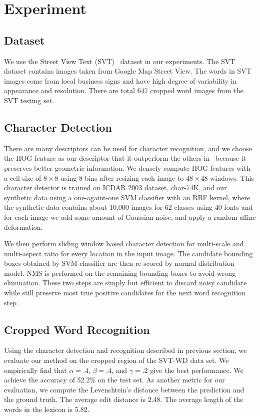 \documentclass[10pt,twocolumn,letterpaper]{article}
\begin{document}
\section{Experiment}
\subsection{Dataset}

We use the Street View Text (SVT)~\cite{417} dataset in our experiments. The SVT dataset contains images taken from Google Map Street View. The words in SVT images come from local business signs and have high degree of variability in appearance and resolution. There are total $647$ cropped word images from the SVT testing set.

\subsection{Character Detection}

There are many descriptors can be used for character recognition, and we choose the HOG feature as our descriptor that it outperform the others in~\cite{117} because it preserves better geometric information. We densely compute HOG features with a cell size of $8 \times 8$ using $8$ bins after resizing each image to $48 \times 48$ windows. This character detector is trained on ICDAR 2003 dataset, char-74K, and our synthetic data using a one-againt-one SVM classifier with an RBF kernel, where the synthetic data contains about 10,000 images for 62 classes using 40 fonts and for each image we add some amount of Gaussian noise, and apply a random affine deformation.

We then perform sliding window based character detection for multi-scale and multi-aspect ratio for every location in the input image. The candidate bounding boxes obtained by SVM classifier are then re-scored by normal distribution model. NMS is performed on the remaining bounding boxes to avoid wrong elimination. These two steps are simply but efficient to discard noisy candidate while still preserve most true positive candidates for the next word recognition step.

\subsection{Cropped Word Recognition}

Using the character detection and recognition described in previous section, we evaluate our method on the cropped region of the SVT-WD data set. We empirically find that $\alpha=.4$, $\beta=.4$, and $\gamma=.2$ give the best performance. We achieve the accuracy of 52.2\% on the test set. As another metric for our evaluation, we compute the Levenshtein's distance between the prediction and the ground truth. The average edit distance is 2.48. The average length of the words in the lexicon is 5.82.
\end{document}
